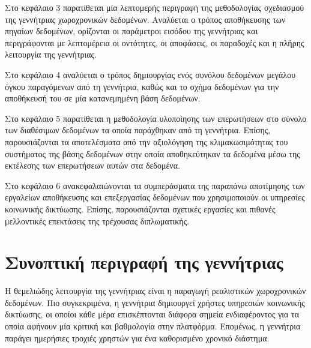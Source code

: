 Στο κεφάλαιο 3 παρατίθεται μία λεπτομερής περιγραφή της μεθοδολογίας σχεδιασμού της \linebreak γεννήτριας χωροχρονικών δεδομένων. Αναλύεται ο τρόπος αποθήκευσης των πηγαίων 
δεδομένων, ορίζονται οι παράμετροι εισόδου της γεννήτριας και περιγράφονται με λεπτομέρεια οι οντότητες, οι αποφάσεις, οι παραδοχές και η πλήρης λειτουργία της 
γεννήτριας. 

Στο κεφάλαιο 4 αναλύεται ο τρόπος δημιουργίας ενός συνόλου δεδομένων μεγάλου όγκου \linebreak παραγόμενων από τη γεννήτρια, καθώς και το σχήμα δεδομένων για την αποθήκευσή του 
σε μία κατανεμημένη βάση δεδομένων. 

Στο κεφάλαιο 5 παρατίθεται η μεθοδολογία υλοποίησης των επερωτήσεων στο σύνολο των \linebreak διαθέσιμων δεδομένων τα οποία παράχθηκαν από τη γεννήτρια. Επίσης, 
παρουσιάζονται τα \linebreak αποτελέσματα από την αξιολόγηση της κλιμακωσιμότητας του συστήματος της βάσης δεδομένων στην οποία αποθηκεύτηκαν τα δεδομένα μέσω 
της εκτέλεσης των επερωτήσεων αυτών στα δεδομένα. 

Στο κεφάλαιο 6 ανακεφαλαιώνονται τα συμπεράσματα της παραπάνω αποτίμησης των εργαλείων αποθήκευσης και επεξεργασίας δεδομένων που χρησιμοποιούν 
οι υπηρεσίες κοινωνικής δικτύωσης. Επίσης, παρουσιάζονται σχετικές εργασίες και πιθανές 
μελλοντικές επεκτάσεις της τρέχουσας \linebreak διπλωματικής. 


\section{Συνοπτική περιγραφή της γεννήτριας}

Η θεμελιώδης λειτουργία της γεννήτριας είναι η παραγωγή ρεαλιστικών χωροχρονικών \linebreak δεδομένων. 
Πιο συγκεκριμένα, η γεννήτρια δημιουργεί χρήστες υπηρεσιών κοινωνικής δικτύωσης, οι οποίοι κάθε μέρα επισκέπτονται διάφορα 
σημεία ενδιαφέροντος για τα οποία αφήνουν μία κριτική και βαθμολογία στην πλατφόρμα. Επομένως, η γεννήτρια παράγει ημερήσιες τροχιές χρηστών για ένα 
καθορισμένο χρονικό διάστημα. 

